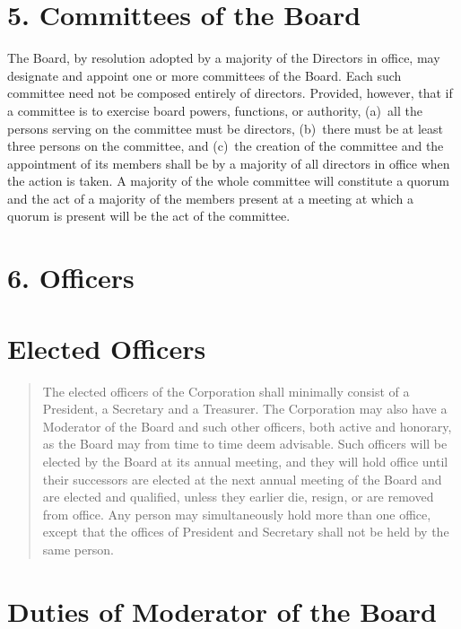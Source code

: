 \documentclass[
]{book}
\begin{document}
\section{5. Committees of the Board}\label{committees-of-the-board}

The Board, by resolution adopted by a majority of the Directors in
office, may designate and appoint one or more committees of the Board.
Each such committee need not be composed entirely of directors.
Provided, however, that if a committee is to exercise board powers,
functions, or authority, (a)~all the persons serving on the committee
must be directors, (b)~there must be at least three persons on the
committee, and (c)~the creation of the committee and the appointment of
its members shall be by a majority of all directors in office when the
action is taken. A majority of the whole committee will constitute a
quorum and the act of a majority of the members present at a meeting at
which a quorum is present will be the act of the committee.

\section{6. Officers}\label{officers}

\section{Elected Officers}\label{elected-officers}

\begin{quote}
The elected officers of the Corporation shall minimally consist of a
President, a Secretary and a Treasurer. The Corporation may also have
a Moderator of the Board and such other officers, both active and
honorary, as the Board may from time to time deem advisable. Such
officers will be elected by the Board at its annual meeting, and they
will hold office until their successors are elected at the next annual
meeting of the Board and are elected and qualified, unless they
earlier die, resign, or are removed from office. Any person may
simultaneously hold more than one office, except that the offices of
President and Secretary shall not be held by the same person.
\end{quote}

\section{Duties of Moderator of the Board}\label{duties-of-moderator-of-the-board}
\end{document}
